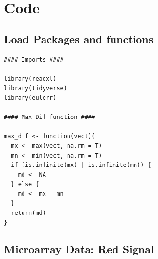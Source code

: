 \documentclass[11pt]{article}
\begin{document}
\section{Code}
\label{sec:org862a98b}
\subsection{Load Packages and functions}
\label{sec:org6f0fca3}
\begin{verbatim}
#### Imports ####

library(readxl)
library(tidyverse)
library(eulerr)

#### Max Dif function ####

max_dif <- function(vect){
  mx <- max(vect, na.rm = T)
  mn <- min(vect, na.rm = T)
  if (is.infinite(mx) | is.infinite(mn)) {
    md <- NA
  } else {
    md <- mx - mn
  }
  return(md)
}
\end{verbatim}

\subsection{Microarray Data: Red Signal}
\label{sec:org74fa92d}
\end{document}
